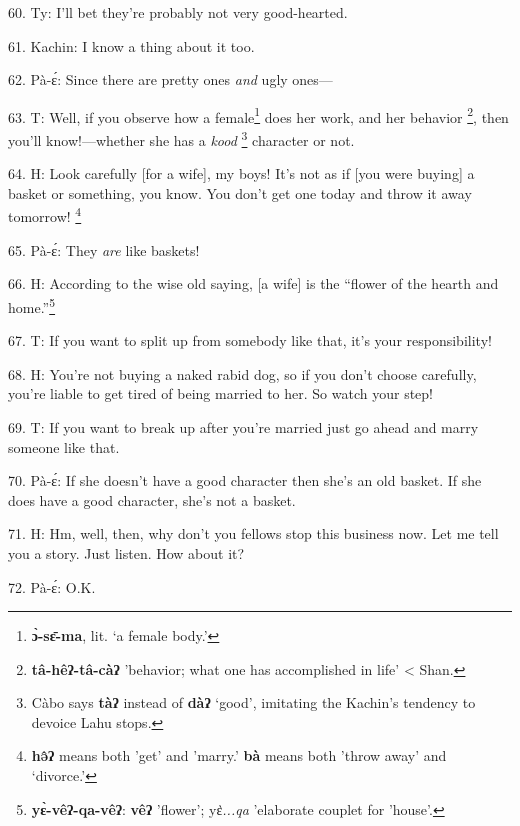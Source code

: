 60. Ty: I'll bet they're probably not very good-hearted.

61. Kachin: I know a thing about it too.

62. Pà-ɛ́: Since there are pretty ones \textit{and} ugly ones---

63. T: Well, if you observe how a female\footnote{\textbf{ɔ̀-sɛ̄-ma}, lit. `a female body.'} does her work, and her behavior
\footnote{\textbf{tâ-hêʔ-tâ-càʔ} 'behavior; what one has accomplished in life' < Shan.}, then you'll know!---whether she has a \textit{kood }\footnote{Càbo says \textbf{tàʔ} instead of \textbf{dàʔ} `good', imitating the Kachin's tendency to devoice Lahu stops.} character or not.

64. H: Look carefully [for a wife], my boys! It's not as if [you were buying] a
basket or something, you know. You don't get one today and throw it away tomorrow!
\footnote{\textbf{hə̂ʔ} means both 'get' and 'marry.' \textbf{bà} means both 'throw away' and `divorce.'}

65. Pà-ɛ́: They \textit{are} like baskets!

66. H: According to the wise old saying, [a wife] is the ``flower of the hearth
and home.''\footnote{\textbf{yɛ̀-vêʔ-qa-vêʔ}: \textbf{vêʔ} 'flower'; yɛ\textit{̀...qa} 'elaborate couplet for 'house'.}

67. T: If you want to split up from somebody like that, it's your responsibility!

68. H: You're not buying a naked rabid dog, so if you don't choose carefully, you're
liable to get tired of being married to her. So watch your step!

69. T: If you want to break up after you're married just go ahead and marry
someone like that.

70. Pà-ɛ́: If she doesn't have a good character then she's an old basket. If
she does have a good character, she's not a basket.

71. H: Hm, well, then, why don't you fellows stop this business now. Let me tell
you a story. Just listen. How about it?

72. Pà-ɛ́: O.K.

